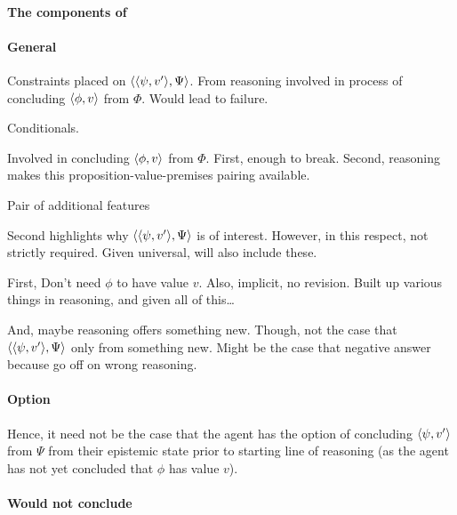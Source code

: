 \paragraph{The components of \qzS{}}



\paragraph{General}

\begin{note}
  Constraints placed on \(\langle \langle \psi, v' \rangle, \Psi \rangle\).
  From reasoning involved in process of concluding \(\langle \phi, v \rangle\) from \(\Phi\).
  Would lead to failure.

  Conditionals.

  Involved in concluding \(\langle \phi, v \rangle\) from \(\Phi\).
  First, enough to break.
  Second, reasoning makes this proposition-value-premises pairing available.

  Pair of additional features

  Second highlights why \(\langle \langle \psi, v' \rangle, \Psi \rangle\) is of interest.
  However, in this respect, not strictly required.
  Given universal, will also include these.

  First,
  Don't need \(\phi\) to have value \(v\).
  Also, implicit, no revision.
  Built up various things in reasoning, and given all of this\dots


  And, maybe reasoning offers something new.
  Though, not the case that \(\langle \langle \psi, v' \rangle, \Psi \rangle\) only from something new.
  Might be the case that negative answer because go off on wrong reasoning.
\end{note}

\paragraph{Option}

\begin{note}
  Hence, it need not be the case that the agent has the option of concluding \(\langle \psi, v' \rangle\) from \(\Psi\) from their epistemic state prior to starting line of reasoning (as the agent has not yet concluded that \(\phi\) has value \(v\)).
\end{note}


\paragraph{Would not conclude}

